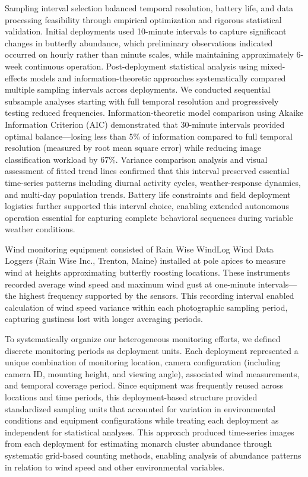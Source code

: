 Sampling interval selection balanced temporal resolution, battery life, and data processing feasibility through empirical optimization and rigorous statistical validation. Initial deployments used 10-minute intervals to capture significant changes in butterfly abundance, which preliminary observations indicated occurred on hourly rather than minute scales, while maintaining approximately 6-week continuous operation. Post-deployment statistical analysis using mixed-effects models and information-theoretic approaches systematically compared multiple sampling intervals across deployments. We conducted sequential subsample analyses starting with full temporal resolution and progressively testing reduced frequencies. Information-theoretic model comparison using Akaike Information Criterion (AIC) demonstrated that 30-minute intervals provided optimal balance—losing less than 5\% of information compared to full temporal resolution (measured by root mean square error) while reducing image classification workload by 67\%. Variance comparison analysis and visual assessment of fitted trend lines confirmed that this interval preserved essential time-series patterns including diurnal activity cycles, weather-response dynamics, and multi-day population trends. Battery life constraints and field deployment logistics further supported this interval choice, enabling extended autonomous operation essential for capturing complete behavioral sequences during variable weather conditions.

Wind monitoring equipment consisted of Rain Wise WindLog Wind Data Loggers (Rain Wise Inc., Trenton, Maine) installed at pole apices to measure wind at heights approximating butterfly roosting locations. These instruments recorded average wind speed and maximum wind gust at one-minute intervals—the highest frequency supported by the sensors. This recording interval enabled calculation of wind speed variance within each photographic sampling period, capturing gustiness lost with longer averaging periods. 

To systematically organize our heterogeneous monitoring efforts, we defined discrete monitoring periods as deployment units. Each deployment represented a unique combination of monitoring location, camera configuration (including camera ID, mounting height, and viewing angle), associated wind measurements, and temporal coverage period. Since equipment was frequently reused across locations and time periods, this deployment-based structure provided standardized sampling units that accounted for variation in environmental conditions and equipment configurations while treating each deployment as independent for statistical analyses. This approach produced time-series images from each deployment for estimating monarch cluster abundance through systematic grid-based counting methods, enabling analysis of abundance patterns in relation to wind speed and other environmental variables.

